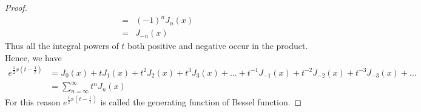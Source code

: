 \documentclass[../main-sheet.tex]{subfiles}
\begin{document}
\begin{proof}
\begin{align*}
        =& (-1)^n J_n(x)\\
        =& J_{-n}(x)
    \end{align*}
    Thus all the integral powers of $ t $ both positive and negative occur in the product.\\
    Hence, we have 
    \begin{align*}
        e^{\frac{1}{2}x\left( t-\frac{1}{t} \right)} &=J_0(x)+tJ_1(x)+t^2J_2(x)+t^3 J_3(x)+\dots+t^{-1}J_{-1}(x)+t^{-2}J_{-2}(x)+t^{-3}J_{-3}(x)+\dots\\
        &= \sum_{n=\infty}^\infty t^n J_n(x) 
    \end{align*}
    For this reason $ e^{\frac{1}{2}x\left( t-\frac{1}{t} \right)} $ is called the generating function of Bessel function.
\end{proof}
\end{document}
